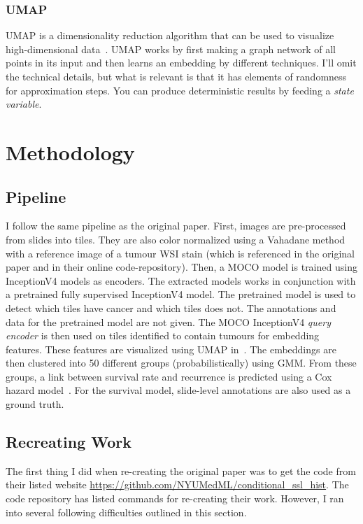 \documentclass[10pt,twocolumn,letterpaper]{article}
\begin{document}
\subsubsection{UMAP}\label{subsubsec:umap}
\gls{UMAP} is a dimensionality reduction algorithm that can be used to visualize high-dimensional data~\cite{umap}. \gls{UMAP} works by first making a graph network of all points in its input and then learns an embedding by different techniques. I'll omit the technical details, but what is relevant is that it has elements of randomness for approximation steps. You can produce deterministic results by feeding a \textit{state variable}.


\section{Methodology}\label{sec:methodology}
\subsection{Pipeline}
I follow the same pipeline as the original paper. First, images are pre-processed from slides into tiles. They are also color normalized using a Vahadane method~\cite{vahadane} with a reference image of a tumour \gls{WSI} stain (which is referenced in the original paper and in their online code-repository). Then, a \gls{MOCO} model is trained using InceptionV4 models as encoders. The extracted models works in conjunction with a pretrained fully supervised InceptionV4 model. The pretrained model is used to detect which tiles have cancer and which tiles does not. The annotations and data for the pretrained model are not given. The \gls{MOCO} InceptionV4 \textit{query encoder} is then used on tiles identified to contain tumours for embedding features. These features are visualized using \gls{UMAP} in~. The embeddings are then clustered into 50 different groups (probabilistically) using \gls{GMM}. From these groups, a link between survival rate and recurrence is predicted using a Cox hazard model~\cite{cox1972regression}. For the survival model, slide-level annotations are also used as a ground truth.

\subsection{Recreating Work}
The first thing I did when re-creating the original paper was to get the code from their listed website \href{https://github.com/NYUMedML/conditional_ssl_hist}{https://github.com/NYUMedML/conditional\_ssl\_hist}. The code repository has listed commands for re-creating their work. However, I ran into several following difficulties outlined in this section.
\end{document}
